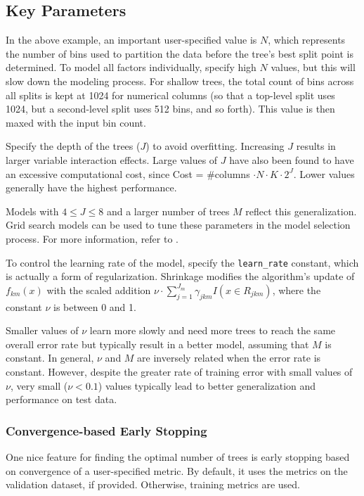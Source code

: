 \subsection{Key Parameters}
\label{ssec:Key parameters}
\raggedbottom
In the above example, an important user-specified value is $N$, which represents the number of bins used to partition the data before the tree's best split point is determined. To model all factors individually, specify high $N$ values, but this will slow down the modeling process. For shallow trees,  the total count of bins across all splits is kept at 1024  for numerical columns (so that a top-level split uses 1024, but a second-level split uses 512 bins, and so forth). This value is then maxed with the input bin count.

Specify the depth of the trees ($J$) to avoid overfitting. Increasing $J$ results in larger variable interaction effects. Large values of $J$ have also been found to have an excessive computational cost,
since Cost = \#columns $\cdot N \cdot K \cdot 2^{J}$. Lower values generally have the highest
performance. 

Models with $4 \leq J \leq 8$ and a larger number of trees $M$ reflect this generalization.
Grid search models can be used to tune these parameters in the model selection process. For more information, refer to {\textbf{}}. 

To control the learning rate of the model, specify the \texttt{learn\_rate} constant, which is actually a
form of regularization. Shrinkage modifies the algorithm's update of $f_{km}(x)$ with the scaled
addition $\nu \cdot \sum_{j=1}^{J_m} \gamma_{jkm} I(x \in R_{jkm})$, where the constant $\nu$ is between 0 and 1. 

Smaller values of $\nu$ learn more slowly and need more trees to reach the same overall error rate but typically result in a better model, assuming that $M$ is constant. In general, $\nu$ and $M$ are inversely related when the error rate is  constant. However, despite the greater rate of training error with small values of $\nu$, very small ($\nu < 0.1$) values typically lead to better generalization and performance on test data.

\newpage
\subsubsection{Convergence-based Early Stopping}
One nice feature for finding the optimal number of trees is early stopping based on convergence of a user-specified metric. By default, it uses the metrics on the validation dataset, if provided. Otherwise, training metrics are used.


